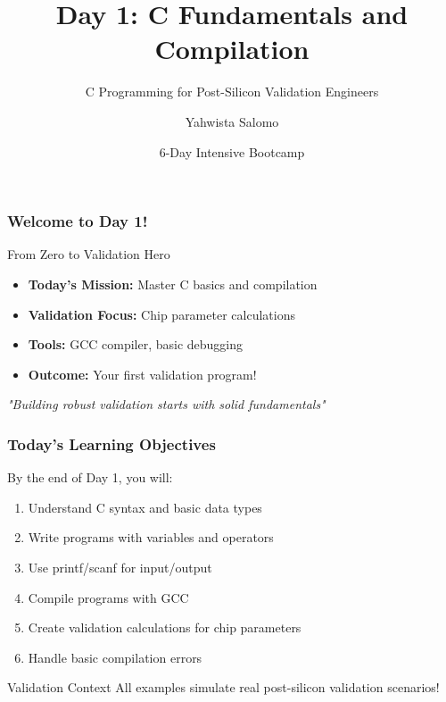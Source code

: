 \documentclass{beamer}
\title{Day 1: C Fundamentals and Compilation}
\subtitle{C Programming for Post-Silicon Validation Engineers}
\author{Yahwista Salomo}
\date{6-Day Intensive Bootcamp}
\institute{Post-Silicon Validation Training Program}
\begin{document}
\frame{\titlepage}

\begin{frame}
\frametitle{Welcome to Day 1!}
\begin{center}
\Large From Zero to Validation Hero
\end{center}

\begin{itemize}
    \item \textbf{Today's Mission:} Master C basics and compilation
    \item \textbf{Validation Focus:} Chip parameter calculations
    \item \textbf{Tools:} GCC compiler, basic debugging
    \item \textbf{Outcome:} Your first validation program!
\end{itemize}

\vspace{0.5cm}
\begin{center}
\textit{"Building robust validation starts with solid fundamentals"}
\end{center}
\end{frame}

\begin{frame}
\frametitle{Today's Learning Objectives}
By the end of Day 1, you will:

\begin{enumerate}
    \item Understand C syntax and basic data types
    \item Write programs with variables and operators
    \item Use printf/scanf for input/output
    \item Compile programs with GCC
    \item Create validation calculations for chip parameters
    \item Handle basic compilation errors
\end{enumerate}

\vspace{0.5cm}
\begin{alertblock}{Validation Context}
All examples simulate real post-silicon validation scenarios!
\end{alertblock}
\end{frame}
\end{document}
